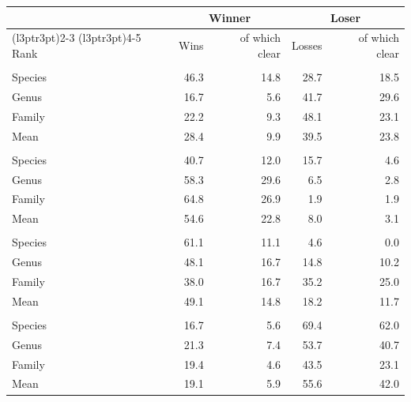 
\begin{tabular}{lrrrr}
\toprule
\multicolumn{1}{c}{ } & \multicolumn{2}{c}{Winner} & \multicolumn{2}{c}{Loser} \\
\cmidrule(l{3pt}r{3pt}){2-3} \cmidrule(l{3pt}r{3pt}){4-5}
Rank & Wins & of which clear & Losses & of which clear\\
\midrule
\addlinespace[0.3em]
\multicolumn{5}{l}{\textbf{Flat}}\\
\hspace{1em}Species & 46.3 & 14.8 & 28.7 & 18.5\\
\hspace{1em}Genus & 16.7 & 5.6 & 41.7 & 29.6\\
\hspace{1em}Family & 22.2 & 9.3 & 48.1 & 23.1\\
\hspace{1em}Mean & 28.4 & 9.9 & 39.5 & 23.8\\
\addlinespace[0.3em]
\multicolumn{5}{l}{\textbf{Hierarchical}}\\
\hspace{1em}Species & 40.7 & 12.0 & 15.7 & 4.6\\
\hspace{1em}Genus & 58.3 & 29.6 & 6.5 & 2.8\\
\hspace{1em}Family & 64.8 & 26.9 & 1.9 & 1.9\\
\hspace{1em}Mean & 54.6 & 22.8 & 8.0 & 3.1\\
\addlinespace[0.3em]
\multicolumn{5}{l}{\textbf{Independent}}\\
\hspace{1em}Species & 61.1 & 11.1 & 4.6 & 0.0\\
\hspace{1em}Genus & 48.1 & 16.7 & 14.8 & 10.2\\
\hspace{1em}Family & 38.0 & 16.7 & 35.2 & 25.0\\
\hspace{1em}Mean & 49.1 & 14.8 & 18.2 & 11.7\\
\addlinespace[0.3em]
\multicolumn{5}{l}{\textbf{Conditional}}\\
\hspace{1em}Species & 16.7 & 5.6 & 69.4 & 62.0\\
\hspace{1em}Genus & 21.3 & 7.4 & 53.7 & 40.7\\
\hspace{1em}Family & 19.4 & 4.6 & 43.5 & 23.1\\
\hspace{1em}Mean & 19.1 & 5.9 & 55.6 & 42.0\\
\bottomrule
\end{tabular}
